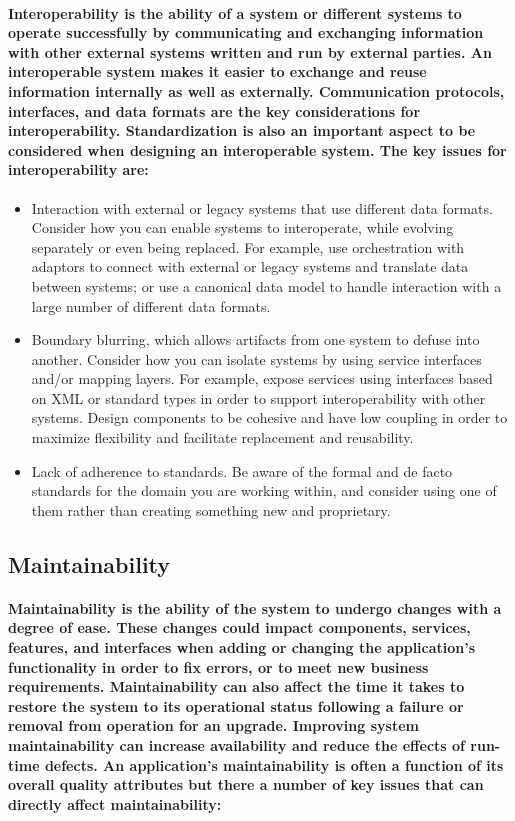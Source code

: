 \documentclass[../Psychological_system_web_application.tex]{subfiles}
\begin{document}
				\paragraph{\gls{Interoperability} is the ability of a system or different systems to operate successfully by communicating and exchanging information with other external systems written and run by external parties. An interoperable system makes it easier to exchange and reuse information internally as well as externally. Communication protocols, interfaces, and data formats are the key considerations for interoperability. Standardization is also an important aspect to be considered when designing an interoperable system. The key issues for interoperability are:}
				
				\begin{itemize}
					\item
						Interaction with external or legacy systems that use different data formats. Consider how you can enable systems to interoperate, while evolving separately or even being replaced. For example, use orchestration with adaptors to connect with external or legacy systems and translate data between systems; or use a canonical data model to handle interaction with a large number of different data formats.
					\item
						Boundary blurring, which allows artifacts from one system to defuse into another. Consider how you can isolate systems by using service interfaces and/or mapping layers. For example, expose services using interfaces based on XML or standard types in order to support interoperability with other systems. Design components to be cohesive and have low coupling in order to maximize flexibility and facilitate replacement and reusability.
					\item
						Lack of adherence to standards. Be aware of the formal and de facto standards for the domain you are working within, and consider using one of them rather than creating something new and proprietary.
					
				\end{itemize}
			
			\subsection{Maintainability}
			
				\paragraph{\gls{Maintainability} is the ability of the system to undergo changes with a degree of ease. These changes could impact components, services, features, and interfaces when adding or changing the application’s functionality in order to fix errors, or to meet new business requirements. Maintainability can also affect the time it takes to restore the system to its operational status following a failure or removal from operation for an upgrade. Improving system maintainability can increase availability and reduce the effects of run-time defects. An application’s maintainability is often a function of its overall quality attributes but there a number of key issues that can directly affect maintainability:}
				
\end{document}

